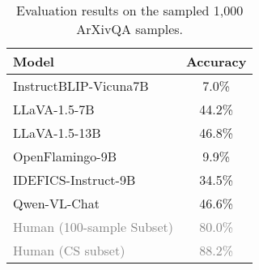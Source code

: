 
\begin{table}[t!]
    \centering
    \small 
    \begin{tabular}{l|c}
        \toprule
        Model & Accuracy \\
        \midrule
        InstructBLIP-Vicuna7B & 7.0\% \\
        LLaVA-1.5-7B & 44.2\% \\
        LLaVA-1.5-13B & 46.8\% \\
        OpenFlamingo-9B & 9.9\% \\
        IDEFICS-Instruct-9B & 34.5\% \\
        Qwen-VL-Chat & 46.6\% \\
        \midrule 
        \textcolor{gray}{Human (100-sample Subset)} & \textcolor{gray}{80.0\%} \\
        \textcolor{gray}{Human (CS subset)} & \textcolor{gray}{88.2\%} \\
        \bottomrule
    \end{tabular}
    \caption{Evaluation results on the sampled 1,000 ArXivQA samples. }
    \label{tab:arxiv_qa_acc}
\end{table}